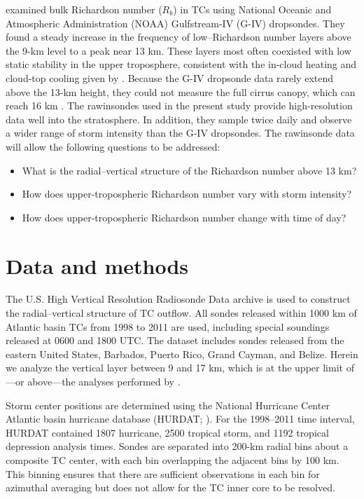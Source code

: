 \cite{Molinarietal2014} examined bulk Richardson number ($R_b$) in TCs using National Oceanic and Atmospheric Administration (NOAA) Gulfstream-IV (G-IV) dropsondes.
They found a steady increase in the frequency of low--Richardson number layers above the 9-km level to a peak near 13 km.
These layers most often coexisted with low static stability in the upper troposphere, consistent with the in-cloud heating and cloud-top cooling given by \cite{Buetal2014}.
Because the G-IV dropsonde data rarely extend above the 13-km height, they could not measure the full cirrus canopy, which can reach 16 km \citep{Waco1970}.
The rawinsondes used in the present study provide high-resolution data well into the stratosphere.
In addition, they sample twice daily and observe a wider range of storm intensity than the G-IV dropsondes.
The rawinsonde data will allow the following questions to be addressed:
\begin{itemize}
   \item What is the radial–vertical structure of the Richardson number above 13 km?
   \item How does upper-tropospheric Richardson number vary with storm intensity?
   \item How does upper-tropospheric Richardson number change with time of day?
\end{itemize}

\section{Data and methods}
The U.S. High Vertical Resolution Radiosonde Data archive \citep{LoveGeller2012} is used to construct the radial–vertical structure of TC outflow.
All sondes released within 1000 km of Atlantic basin TCs from 1998 to 2011 are used, including special soundings released at 0600 and 1800 UTC.
The dataset includes sondes released from the eastern United States, Barbados, Puerto Rico, Grand Cayman, and Belize.
Herein we analyze the vertical layer between 9 and 17 km, which is at the upper limit of---or above---the analyses performed by \cite{Molinarietal2014}.

Storm center positions are determined using the National Hurricane Center Atlantic basin hurricane database (HURDAT; \citeauthor{Jarvinenetal1984} \citeyear{Jarvinenetal1984}).
For the 1998–2011 time interval, HURDAT contained 1807 hurricane, 2500 tropical storm, and 1192 tropical depression analysis times.
Sondes are separated into 200-km radial bins about a composite TC center, with each bin overlapping the adjacent bins by 100 km.
This binning ensures that there are sufficient observations in each bin for azimuthal averaging but does not allow for the TC inner core to be resolved.

